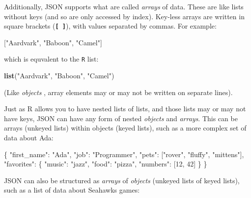 \documentclass[]{book}
\newenvironment{Shaded}{\begin{snugshade}}{\end{snugshade}}
\newcommand{\KeywordTok}[1]{\textcolor[rgb]{0.13,0.29,0.53}{\textbf{#1}}}
\newcommand{\DataTypeTok}[1]{\textcolor[rgb]{0.13,0.29,0.53}{#1}}
\newcommand{\DecValTok}[1]{\textcolor[rgb]{0.00,0.00,0.81}{#1}}
\newcommand{\StringTok}[1]{\textcolor[rgb]{0.31,0.60,0.02}{#1}}
\newcommand{\OtherTok}[1]{\textcolor[rgb]{0.56,0.35,0.01}{#1}}
\newcommand{\FunctionTok}[1]{\textcolor[rgb]{0.00,0.00,0.00}{#1}}
\newcommand{\NormalTok}[1]{#1}
\theoremstyle{definition}
\theoremstyle{definition}
\theoremstyle{remark}
\begin{document}
Additionally, JSON supports what are called \emph{arrays} of data. These
are like lists without keys (and so are only accessed by index).
Key-less arrays are written in square brackets
(\textbf{\texttt{{[}\ {]}}}), with values separated by commas. For
example:

\begin{Shaded}
\begin{Highlighting}[]
\OtherTok{[}\StringTok{"Aardvark"}\OtherTok{,} \StringTok{"Baboon"}\OtherTok{,} \StringTok{"Camel"}\OtherTok{]}
\end{Highlighting}
\end{Shaded}

which is equvalent to the \texttt{R} list:

\begin{Shaded}
\begin{Highlighting}[]
\KeywordTok{list}\NormalTok{(}\StringTok{"Aardvark"}\NormalTok{, }\StringTok{"Baboon"}\NormalTok{, }\StringTok{"Camel"}\NormalTok{)}
\end{Highlighting}
\end{Shaded}

(Like \emph{objects} , array elements may or may not be written on
separate lines).

Just as R allows you to have nested lists of lists, and those lists may
or may not have keys, JSON can have any form of nested \emph{objects}
and \emph{arrays}. This can be arrays (unkeyed lists) within objects
(keyed lists), such as a more complex set of data about Ada:

\begin{Shaded}
\begin{Highlighting}[]
\FunctionTok{\{}
  \DataTypeTok{"first_name"}\FunctionTok{:} \StringTok{"Ada"}\FunctionTok{,}
  \DataTypeTok{"job"}\FunctionTok{:} \StringTok{"Programmer"}\FunctionTok{,}
  \DataTypeTok{"pets"}\FunctionTok{:} \OtherTok{[}\StringTok{"rover"}\OtherTok{,} \StringTok{"fluffy"}\OtherTok{,} \StringTok{"mittens"}\OtherTok{]}\FunctionTok{,}
  \DataTypeTok{"favorites"}\FunctionTok{:} \FunctionTok{\{}
    \DataTypeTok{"music"}\FunctionTok{:} \StringTok{"jazz"}\FunctionTok{,}
    \DataTypeTok{"food"}\FunctionTok{:} \StringTok{"pizza"}\FunctionTok{,}
    \DataTypeTok{"numbers"}\FunctionTok{:} \OtherTok{[}\DecValTok{12}\OtherTok{,} \DecValTok{42}\OtherTok{]}
  \FunctionTok{\}}
\FunctionTok{\}}
\end{Highlighting}
\end{Shaded}

JSON can also be structured as \emph{arrays} of \emph{objects} (unkeyed
lists of keyed lists), such as a list of data about Seahawks games:
\end{document}

